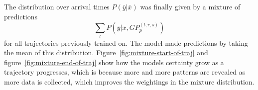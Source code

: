\noindent
The distribution over arrival times $P(\bar{y} | \bar{x})$ was finally given by a mixture of predictions
\begin{equation}
  \label{eq:model-mixture}
  \sum_{t}{P(\bar{y}|\bar{x}, GP_p^{(t, r,s)})}
\end{equation}
for all trajectories previously trained on. The model made predictions by taking the mean of this distribution. Figure~\ref{fig:mixture-start-of-traj} and figure~\ref{fig:mixture-end-of-traj} show how the models certainty grow as a trajectory progresses, which is because more and more patterns are revealed as more data is collected, which improves the weightings in the mixture distribution.



